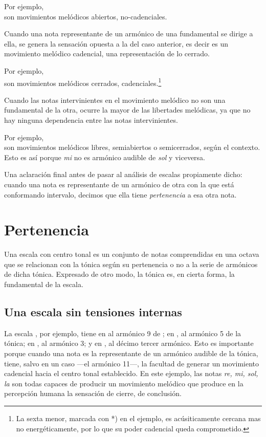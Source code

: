 \documentclass[a4paper,12pt]{article}
\begin{document}
\begin{multicols}{2}
  Por ejemplo, \\   son movimientos melódicos abiertos, no-cadenciales.

  Cuando una nota representante de un armónico de una fundamental se dirige a ella, se genera la sensación opuesta a la del caso anterior, es decir es un movimiento melódico cadencial, una representación de lo cerrado.

  Por ejemplo, \\  son movimientos melódicos cerrados, cadenciales.\footnote{La sexta menor, marcada con *) en el ejemplo, es acúsiticamente cercana mas no energéticamente, por lo que su poder cadencial queda comprometido.}

  Cuando las notas intervinientes en el movimiento melódico no son una fundamental de la otra, ocurre la mayor de las libertades melódicas, ya que no hay ninguna dependencia entre las notas intervinientes.

  Por ejemplo, \\   son movimientos melódicos libres, semiabiertos o semicerrados, según el contexto. Esto es así porque \emph{mi} no es armónico audible de \emph{sol} y viceversa.

  Una aclaración final antes de pasar al análisis de escalas propiamente dicho: cuando una nota es representante de un armónico de otra con la que está conformando intervalo, decimos que ella tiene \emph{pertenencia} a esa otra nota.

\section{Pertenencia}\label{sec:pertenencia}
  Una escala con centro tonal es un conjunto de notas comprendidas en una octava que se relacionan con la tónica según su pertenencia o no a la serie de armónicos de dicha tónica. Expresado de otro modo, la tónica es, en cierta forma, la fundamental de la escala.

    \subsection{Una escala sin tensiones internas}\label{subsec:escala-sin-tensiones}
    La escala \hbox{,} por ejemplo, tiene en  al armónico 9 de \hbox{;} en \hbox{,} al armónico 5 de la tónica; en \hbox{,} al armónico 3; y en \hbox{,} al décimo tercer armónico. Esto es importante porque cuando una nota es la representante de un armónico audible de la tónica, tiene, salvo en un caso ---el armónico 11---, la facultad de generar un movimiento cadencial hacia el centro tonal establecido. En este ejemplo, las notas \emph{re, mi, sol, la} son todas capaces de producir un movimiento melódico que produce en la percepción humana la sensación de cierre, de conclusión.
\end{multicols}
\end{document}
